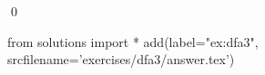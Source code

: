 
\begin{ex} 
  \label{ex:dfa3}
  
  \qed
\end{ex} 
\begin{python0}
from solutions import *
add(label="ex:dfa3",
    srcfilename='exercises/dfa3/answer.tex') 
\end{python0}
